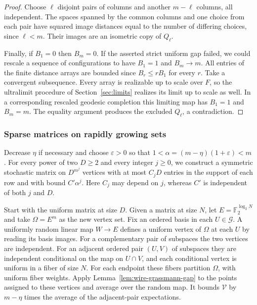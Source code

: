\begin{proof}
Choose $\ell$ disjoint pairs of columns and another $m-\ell$ columns,
all independent. The spaces spanned by the common columns and one choice
from each pair have squared image distances equal to the number of
differing choices, since $\ell<m$. Their images are an isometric copy
of $Q_\ell$.

Finally, if $B_1=0$ then $B_m=0$. If the asserted strict uniform gap
failed, we could rescale a sequence of configurations to have $B_1=1$
and $B_m\to m$. All entries of the finite distance arrays are bounded since
$B_r\le rB_1$ for every $r$. Take a convergent subsequence. Every array
is realizable up to scale over $F$, so the ultralimit procedure of Section~\ref{sec:limits}
realizes its limit up to scale as well. In a corresponding rescaled
geodesic completion this limiting map has $B_1=1$ and $B_m=m$. The
equality argument produces the excluded $Q_\ell$, a contradiction.
\end{proof}

\subsubsection{Sparse matrices on rapidly growing sets}
Decrease $\eta$ if necessary and choose $\varepsilon>0$ so that
$1<\alpha=(m-\eta)(1+\varepsilon)<m$. For every power of two $D\ge2$
and every integer $j\ge0$, we construct a symmetric stochastic matrix on
$D^{m^j}$ vertices with at most $C_jD$ entries in the support of each row
and with bound $C'\alpha^j$. Here $C_j$ may depend on $j$, whereas $C'$
is independent of both $j$ and $D$.

Start with the uniform matrix at size $D$. Given a matrix at size $N$,
let $E=\mathbb F_2^{\log_2 N}$ and take $\Omega=E^m$ as the new vertex
set. Fix an ordered basis in each $U\in\mathcal G$. A uniformly random
linear map $W\to E$ defines a uniform vertex of $\Omega$ at each $U$ by
reading its basis images. For a complementary pair of subspaces the two
vertices are independent. For an adjacent ordered pair $(U,V)$ of
subspaces they are independent conditional on the map on $U\cap V$, and
each conditional vertex is uniform in a fiber of size $N$. For each
endpoint these fibers partition $\Omega$, with uniform fiber weights.
Apply Lemma~\ref{lem:wire-grassmann-gap} to the points assigned to these
vertices and average over the random map. It bounds $\mathcal V$ by
$m-\eta$ times the average of the adjacent-pair expectations.

